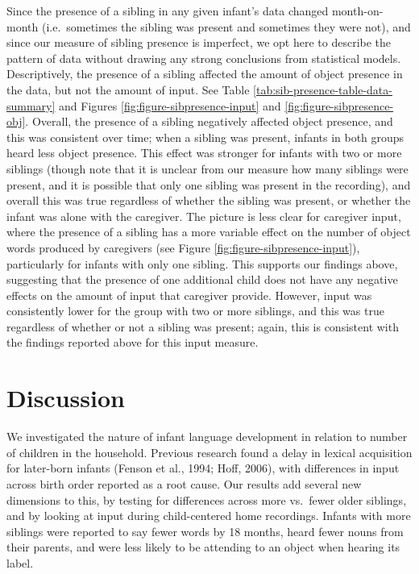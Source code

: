 \documentclass[
  man,floatsintext]{apa6}
\begin{document}
Since the presence of a sibling in any given infant's data changed month-on-month (i.e.~sometimes the sibling was present and sometimes they were not), and since our measure of sibling presence is imperfect, we opt here to describe the pattern of data without drawing any strong conclusions from statistical models. Descriptively, the presence of a sibling affected the amount of object presence in the data, but not the amount of input. See Table \ref{tab:sib-presence-table-data-summary} and Figures \ref{fig:figure-sibpresence-input} and \ref{fig:figure-sibpresence-obj}. Overall, the presence of a sibling negatively affected object presence, and this was consistent over time; when a sibling was present, infants in both groups heard less object presence. This effect was stronger for infants with two or more siblings (though note that it is unclear from our measure how many siblings were present, and it is possible that only one sibling was present in the recording), and overall this was true regardless of whether the sibling was present, or whether the infant was alone with the caregiver. The picture is less clear for caregiver input, where the presence of a sibling has a more variable effect on the number of object words produced by caregivers (see Figure \ref{fig:figure-sibpresence-input}), particularly for infants with only one sibling. This supports our findings above, suggesting that the presence of one additional child does not have any negative effects on the amount of input that caregiver provide. However, input was consistently lower for the group with two or more siblings, and this was true regardless of whether or not a sibling was present; again, this is consistent with the findings reported above for this input measure.

\hypertarget{discussion}{%
\section{Discussion}\label{discussion}}

We investigated the nature of infant language development in relation to number of children in the household. Previous research found a delay in lexical acquisition for later-born infants (Fenson et al., 1994; Hoff, 2006), with differences in input across birth order reported as a root cause. Our results add several new dimensions to this, by testing for differences across more vs.~fewer older siblings, and by looking at input during child-centered home recordings. Infants with more siblings were reported to say fewer words by 18 months, heard fewer nouns from their parents, and were less likely to be attending to an object when hearing its label.
\end{document}
